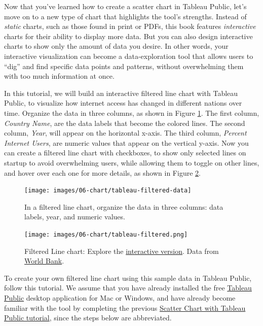 \documentclass[
  english,
]{book}
\begin{document}
Now that you've learned how to create a scatter chart in Tableau Public, let's move on to a new type of chart that highlights the tool's strengths. Instead of \emph{static} charts, such as those found in print or PDFs, this book features \emph{interactive} charts for their ability to display more data. But you can also design interactive charts to show only the amount of data you desire. In other words, your interactive visualization can become a data-exploration tool that allows users to ``dig'' and find specific data points and patterns, without overwhelming them with too much information at once.

In this tutorial, we will build an interactive filtered line chart with Tableau Public, to visualize how internet access has changed in different nations over time. Organize the data in three columns, as shown in Figure \ref{fig:tableau-filtered-data}. The first column, \emph{Country Name}, are the data labels that become the colored lines. The second column, \emph{Year}, will appear on the horizontal x-axis. The third column, \emph{Percent Internet Users}, are numeric values that appear on the vertical y-axis. Now you can create a filtered line chart with checkboxes, to show only selected lines on startup to avoid overwhelming users, while allowing them to toggle on other lines, and hover over each one for more details, as shown in Figure \ref{fig:tableau-filtered}.



\begin{figure}
\texttt{[image: images/06-chart/tableau-filtered-data]} \caption{In a filtered line chart, organize the data in three columns: data labels, year, and numeric values.}\label{fig:tableau-filtered-data}
\end{figure}



\begin{figure}
\centering
\texttt{[image: images/06-chart/tableau-filtered.png]}
\caption{\label{fig:tableau-filtered}Filtered Line chart: Explore the \href{https://public.tableau.com/profile/ilya7257\#!/vizhome/InternetAccessbyCountry/Sheet1}{interactive version}. Data from \href{https://docs.google.com/spreadsheets/d/1nrfd8Cr-wpm5N9WGA2YO6d1XLuwk-VK8kCvDwoTdeWM/edit\#gid=600173793}{World Bank}.}
\end{figure}

To create your own filtered line chart using this sample data in Tableau Public, follow this tutorial. We assume that you have already installed the free \href{https://public.tableau.com}{Tableau Public} desktop application for Mac or Windows, and have already become familiar with the tool by completing the previous \href{scatter-tableau.html}{Scatter Chart with Tableau Public tutorial}, since the steps below are abbreviated.
\end{document}
